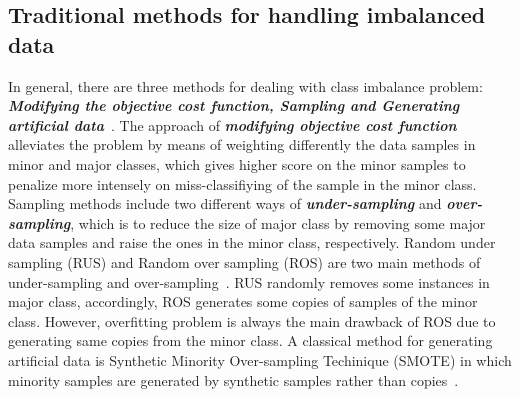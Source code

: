 \documentclass[conference]{IEEEtran}
\begin{document}
\subsection{Traditional methods for handling imbalanced data}
In general, there are three methods for dealing with class imbalance problem: \emph{\textbf{Modifying the objective cost function, Sampling and Generating artificial data}}~\cite{Vu2016}. The approach of \emph{\textbf{modifying objective cost function}} alleviates the problem by means of weighting differently the data samples in minor and major classes, which gives higher score on the minor samples to penalize more intensely on miss-classifiying of the sample in the minor class. Sampling methods include two different ways of \emph{\textbf{under-sampling}} and \emph{\textbf{over-sampling}}, which is to reduce the size of major class by removing some major data samples and raise the ones in the minor class, respectively. Random under sampling (RUS) and Random over sampling (ROS) are two main methods of under-sampling and over-sampling~\cite{ROS2000}. RUS randomly removes some instances in major class, accordingly, ROS generates some copies of samples of the minor class. However, overfitting problem is always the main drawback of ROS due to generating same copies from the minor class. A classical method for generating artificial data is Synthetic Minority Over-sampling Techinique (SMOTE) in which minority samples are generated by synthetic samples rather than copies~\cite{SMOTE2002}.
\end{document}
